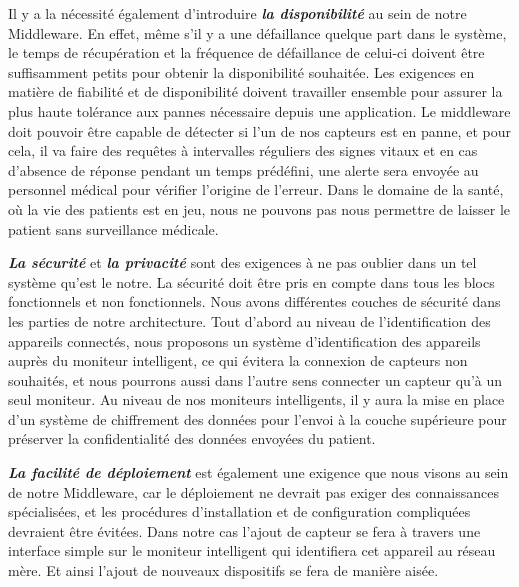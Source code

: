 Il y a la nécessité également d'introduire \textbf{\textit{la disponibilité}} au sein de notre Middleware. En effet, même s'il y a une défaillance quelque part dans le système, le temps de récupération et la fréquence de défaillance de celui-ci doivent être suffisamment petits pour obtenir la disponibilité souhaitée. Les exigences en matière de fiabilité et de disponibilité doivent travailler ensemble pour assurer la plus haute tolérance aux pannes nécessaire depuis une application. Le middleware doit pouvoir être capable de détecter si l’un de nos capteurs est en panne, et pour cela, il va faire des requêtes à intervalles réguliers des signes vitaux et en cas d’absence de réponse pendant un temps prédéfini, une alerte sera envoyée au personnel médical pour vérifier l’origine de l’erreur. Dans le domaine de la santé, où la vie des patients est en jeu, nous ne pouvons pas nous permettre de laisser le patient sans surveillance médicale.

\textbf{\textit{La sécurité}} et \textbf{\textit{la privacité}} sont des exigences à ne pas oublier dans un tel système qu'est le notre. La sécurité doit être pris en compte dans tous les blocs fonctionnels et non fonctionnels. Nous avons différentes couches de sécurité dans les parties de notre architecture. Tout d’abord au niveau de l’identification des appareils connectés, nous proposons un système d’identification des appareils auprès du moniteur intelligent, ce qui évitera la connexion de capteurs non souhaités, et nous pourrons aussi dans l’autre sens connecter un capteur qu’à un seul moniteur. Au niveau de nos moniteurs intelligents, il y aura la mise en place d’un système de chiffrement des données pour l’envoi à la couche supérieure pour préserver la confidentialité des données envoyées du patient.

\textbf{\textit{La facilité de déploiement}} est également une exigence que nous visons au sein de notre Middleware, car le déploiement ne devrait pas exiger des connaissances spécialisées, et les procédures d'installation et de configuration compliquées devraient être évitées. Dans notre cas l’ajout de capteur se fera à travers une interface simple sur le moniteur intelligent qui identifiera cet appareil au réseau mère. Et ainsi l’ajout de nouveaux dispositifs se fera de manière aisée.